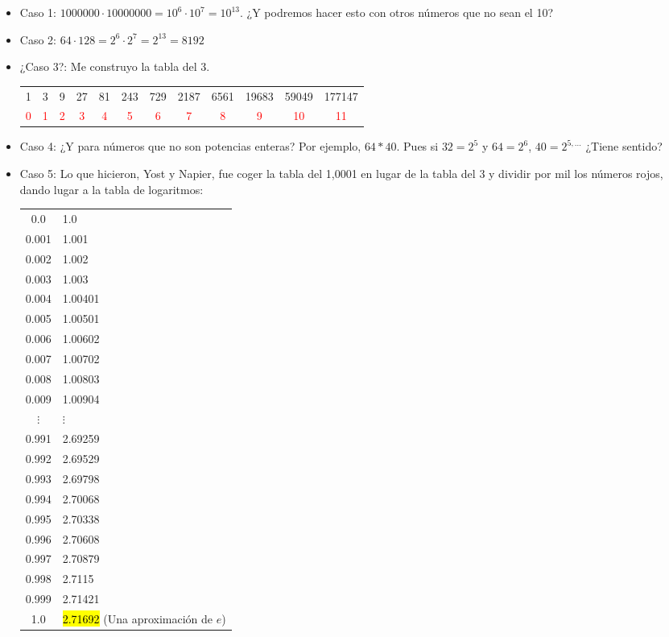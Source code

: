 \begin{itemize}
\item Caso 1: $1000000·10000000 = 10^6·10^7 = 10^{13}$. ¿Y podremos hacer esto con otros números que no sean el 10?

\item Caso 2: $64·128 = 2^6·2^7 = 2^{13} = 8192$
\item ¿Caso 3?: Me construyo la tabla del 3.
\begin{center}
\begin{tabular}{cccccccccccc}
1& 3& 9& 27& 81& 243& 729& 2187& 6561& 19683& 59049& 177147\\
\textcolor{red}{0} & \textcolor{red}{1} & \textcolor{red}{2} & \textcolor{red}{3} & \textcolor{red}{4} & \textcolor{red}{5} & \textcolor{red}{6} & \textcolor{red}{7} & \textcolor{red}{8} & \textcolor{red}{9} & \textcolor{red}{10} & \textcolor{red}{11}
\end{tabular}
\end{center}
\item Caso 4: ¿Y para números que no son potencias enteras? Por ejemplo, $64*40$. Pues si $32=2^5$ y $64=2^6$, $40=2^{5,...}$ ¿Tiene sentido?

\item Caso 5: Lo que hicieron, Yost y Napier, fue coger la tabla del 1,0001 en lugar de la tabla del 3 y dividir por mil los números rojos, dando lugar a la tabla de logaritmos:

\begin{center}
	\begin{tabular}{cl}
		0.0 & 1.0\\
		0.001 & 1.001\\
		0.002 & 1.002\\
		0.003 & 1.003\\
		0.004 & 1.00401\\
		0.005 & 1.00501\\
		0.006 & 1.00602\\
		0.007 & 1.00702\\
		0.008 & 1.00803\\
		0.009 & 1.00904\\
		$\vdots$ & \quad\quad$\vdots$\\
		0.991 & 2.69259\\
		0.992 & 2.69529\\
		0.993 & 2.69798\\
		0.994 & 2.70068\\
		0.995 & 2.70338\\
		0.996 & 2.70608\\
		0.997 & 2.70879\\
		0.998 & 2.7115\\
		0.999 & 2.71421\\
		1.0 & \hl{2.71692} (Una aproximación de $e$)\\
	\end{tabular}
\end{center}

\end{itemize}

